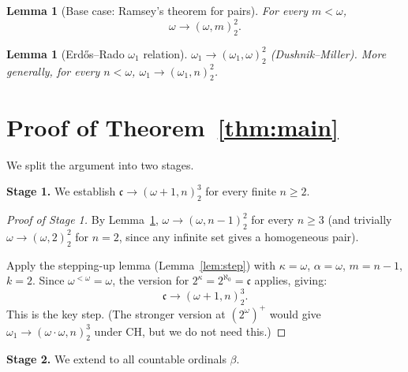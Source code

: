 \documentclass[12pt]{article}
\newtheorem{lemma}[theorem]{Lemma}
\newcommand{\fc}{\mathfrak{c}}
\begin{document}
\begin{lemma}[Base case: Ramsey's theorem for pairs]
\label{lem:ramsey}
For every $m<\omega$,
\[
  \omega\to(\omega, m)^2_2.
\]
\end{lemma}

\begin{lemma}[Erd\H{o}s--Rado $\omega_1$ relation]
\label{lem:omega1}
$\omega_1\to(\omega_1,\omega)^2_2$ \textup{(Dushnik--Miller)}.
More generally, for every $n<\omega$,
$\omega_1\to(\omega_1,n)^2_2$.
\end{lemma}

\section*{Proof of Theorem~\ref{thm:main}}

We split the argument into two stages.

\medskip
\textbf{Stage 1.}  We establish $\fc\to(\omega+1,n)^3_2$ for every finite $n\ge 2$.

\begin{proof}[Proof of Stage 1]
By Lemma~\ref{lem:ramsey}, $\omega\to(\omega,n-1)^2_2$ for every $n\ge 3$
(and trivially $\omega\to(\omega,2)^2_2$ for $n=2$, since any infinite
set gives a homogeneous pair).

Apply the stepping-up lemma (Lemma~\ref{lem:step}) with $\kappa=\omega$,
$\alpha=\omega$, $m=n-1$, $k=2$.  Since $\omega^{<\omega}=\omega$,
the version for $2^\kappa=2^{\aleph_0}=\fc$ applies, giving:
\[
  \fc \to (\omega+1, n)^3_2.
\]
This is the key step.  (The stronger version at $(2^\omega)^+$ would give
$\omega_1\to(\omega\cdot\omega, n)^3_2$ under CH, but we do not need this.)
\end{proof}

\textbf{Stage 2.}  We extend to all countable ordinals $\beta$.
\end{document}
